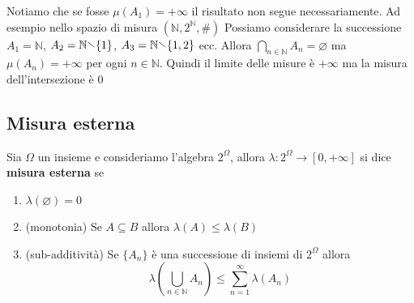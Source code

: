 \begin{remark}
    Notiamo che se fosse \(\mu(A_{1}) = +\infty\) il risultato non segue
    necessariamente. Ad esempio nello spazio di misura \((\mathbb{N},
    2^{\mathbb{N}}, \#)\) Possiamo considerare la successione \(A_{1} =
    \mathbb{N}\), \(A_{2} = \mathbb{N} \sminus \{1\} \), \(A_{3} = \mathbb{N}
    \sminus \{1, 2\} \) ecc. Allora \(\bigcap_{n \in \mathbb{N}} A_{n} =
    \varnothing\) ma \(\mu(A_{n}) = +\infty\) per ogni \(n \in \mathbb{N}\).
    Quindi il limite delle misure è \(+\infty\) ma la misura dell'intersezione è
    \(0\) 
\end{remark}

\newpage
\subsection{Misura esterna}
\begin{definition}
    Sia \(\Omega\) un insieme e consideriamo l'algebra \(2^{\Omega}\), allora
    \(\lambda : 2^{\Omega} \to [0, +\infty]\) si dice \textbf{misura esterna} se 
\begin{enumerate}[label = \arabic*.]
    \item \(\lambda(\varnothing) = 0\) 
    \item (monotonia) Se \(A \subseteq B \) allora \(\lambda(A) \le \lambda(B)\)
    \item (sub-additività) Se \(\{A_{n}\} \) è una successione di insiemi di
        \(2^{\Omega}\) allora \[\lambda\left( \bigcup_{n \in \mathbb{N}} A_{n}
        \right) \le \sum_{n=1}^{\infty} \lambda(A_{n})\]
\end{enumerate}
\end{definition}

